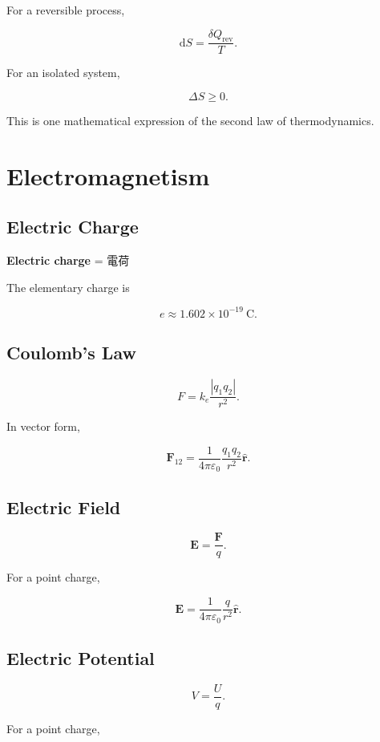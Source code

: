 \documentclass[11pt,a4paper]{article}
\newcommand{\dd}{\mathrm{d}}
\begin{document}
For a reversible process,

\[
\dd S=\frac{\delta Q_{\mathrm{rev}}}{T}.
\]

For an isolated system,

\[
\Delta S\geq0.
\]

This is one mathematical expression of the second law of thermodynamics.

\section{Electromagnetism}

\subsection{Electric Charge}

\textbf{Electric charge} = 電荷

The elementary charge is

\[
e\approx1.602\times10^{-19}\ \mathrm{C}.
\]

\subsection{Coulomb's Law}

\[
F=k_e\frac{|q_1q_2|}{r^2}.
\]

In vector form,

\[
\bm{F}_{12}
=
\frac{1}{4\pi\varepsilon_0}
\frac{q_1q_2}{r^2}\hat{\bm r}.
\]

\subsection{Electric Field}

\[
\bm{E}=\frac{\bm{F}}{q}.
\]

For a point charge,

\[
\bm{E}
=
\frac{1}{4\pi\varepsilon_0}
\frac{q}{r^2}\hat{\bm r}.
\]

\subsection{Electric Potential}

\[
V=\frac{U}{q}.
\]

For a point charge,
\end{document}
